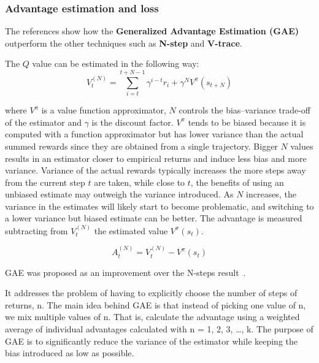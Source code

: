 \documentclass[11pt, a4paper, hidelinks]{report}
\begin{document}
\subsubsection{Advantage estimation and loss}\label{subsubsec:advantage-estimation}

The references show how the \textbf{Generalized Advantage Estimation (GAE)} outperform the other techniques such as \textbf{N-step} and \textbf{V-trace}.

The $Q$ value can be estimated in the following way:
\begin{equation}
	V_t^{(N)} = \sum_{i = t}^{t + N - 1} \gamma^{i - t}r_i + \gamma^{N}V^{\pi}(s_{t + N})\label{eq:N-step}
\end{equation}

where $V^{\pi}$ is a value function approximator, $N$ controls the bias–variance trade-off of the estimator and $\gamma$ is the discount factor.
$V^{\pi}$ tends to be biased because it is computed with a function approximator but has lower variance than the actual summed rewards since they are obtained from a single trajectory.
Bigger $N$ values results in an estimator closer to empirical returns and induce less bias and more variance.
Variance of the actual rewards typically increases the more steps away from the current step $t$ are taken, while close to $t$, the benefits of using an unbiased estimate may outweigh the variance introduced.
As $N$ increases, the variance in the estimates will likely start to become problematic, and switching to a lower variance but biased estimate can be better.
The advantage is measured subtracting from $V_t^{(N)}$ the estimated value $V^{\pi}(s_t)$.

\begin{equation}
	A_t^{(N)} = V_t^{(N)} - V^{\pi}(s_t)\label{eq:N-step-advantage}
\end{equation}

GAE was proposed as an improvement over the N-steps result~\citep{gae}.

\begin{quoting}[font=itshape, begintext={"}, endtext={"\citep{graesser2019foundations}}]
It addresses the problem of having to explicitly choose the number of steps of returns, n.
The main idea behind GAE is that instead of picking one value of n, we mix multiple values of n.
That is, calculate the advantage using a weighted average of individual advantages calculated with n = 1, 2, 3, \dots, k.
The purpose of GAE is to significantly reduce the variance of the estimator while keeping the bias introduced as low as possible.
\end{quoting}
\end{document}
